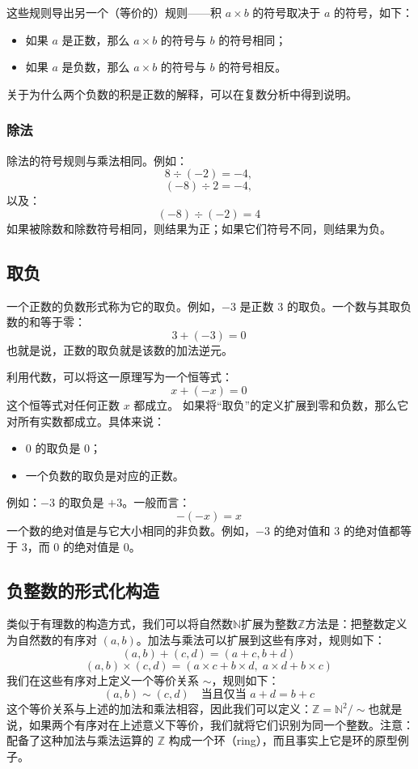 这些规则导出另一个（等价的）规则——积 $a \times b$ 的符号取决于 $a$ 的符号，如下：
\begin{itemize}
\item 如果 $a$ 是正数，那么 $a \times b$ 的符号与 $b$ 的符号相同；
\item 如果 $a$ 是负数，那么 $a \times b$ 的符号与 $b$ 的符号相反。
\end{itemize}
关于为什么两个负数的积是正数的解释，可以在复数分析中得到说明。
\subsubsection{除法}
除法的符号规则与乘法相同。例如：
$$
8 \div  (-2) = -4,~
$$
$$
(-8) \div 2 = -4,~
$$
以及：
$$
(-8) \div (-2) = 4~
$$
如果被除数和除数符号相同，则结果为正；如果它们符号不同，则结果为负。
\subsection{取负}
一个正数的负数形式称为它的取负。例如，$-3$ 是正数 3 的取负。一个数与其取负数的和等于零：
$$
3 + (-3) = 0~
$$
也就是说，正数的取负就是该数的加法逆元。

利用代数，可以将这一原理写为一个恒等式：
$$
x + (-x) = 0~
$$
这个恒等式对任何正数 $x$ 都成立。
如果将“取负”的定义扩展到零和负数，那么它对所有实数都成立。具体来说：
\begin{itemize}
\item 0 的取负是 0；
\item 一个负数的取负是对应的正数。
\end{itemize}
例如：$-3$ 的取负是 $+3$。一般而言：
$$
-(-x) = x~
$$
一个数的绝对值是与它大小相同的非负数。例如，$-3$ 的绝对值和 $3$ 的绝对值都等于 3，而 $0$ 的绝对值是 0。
\subsection{负整数的形式化构造}
类似于有理数的构造方式，我们可以将自然数$\mathbb{N}$扩展为整数$\mathbb{Z}$方法是：把整数定义为自然数的有序对 $(a, b)$。加法与乘法可以扩展到这些有序对，规则如下：
$$
(a, b) + (c, d) = (a + c, b + d)~
$$
$$
(a, b) \times (c, d) = (a \times c + b \times d, \; a \times d + b \times c)~
$$
我们在这些有序对上定义一个等价关系 $\sim$，规则如下：
$$
(a, b) \sim (c, d) \quad \text{当且仅当 } a + d = b + c~
$$
这个等价关系与上述的加法和乘法相容，因此我们可以定义：$\mathbb{Z} = \mathbb{N}^2 / \sim$也就是说，如果两个有序对在上述意义下等价，我们就将它们识别为同一个整数。注意：配备了这种加法与乘法运算的 $\mathbb{Z}$ 构成一个环（ring），而且事实上它是环的原型例子。

